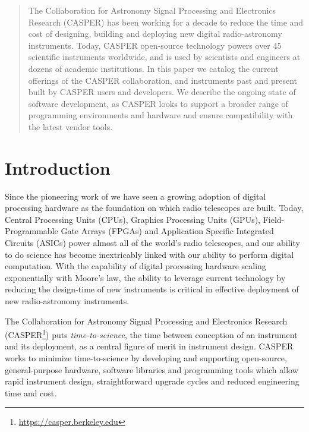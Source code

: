 \documentclass{ws-jai}
\begin{document}
\begin{abstract}

The Collaboration for Astronomy Signal Processing and Electronics Research
(CASPER) has been working for a decade to reduce the time and cost of
designing, building and deploying new digital radio-astronomy instruments.
Today, CASPER open-source technology powers over 45 scientific instruments
worldwide, and is used by scientists and engineers at dozens of academic
institutions.  In this paper we catalog the current offerings of the CASPER
collaboration, and instruments past and present built by CASPER users and developers.
We describe the ongoing state of software development, as CASPER looks to
support a broader range of programming environments and hardware and ensure compatibility
with the latest vendor tools.

\end{abstract}


\section{Introduction}\label{sec:introduction}

Since the pioneering work of \citet{Weinreb} we
have seen a growing adoption of digital processing hardware as the foundation
on which radio telescopes are built.  Today, Central Processing Units (CPUs), Graphics Processing Units (GPUs), Field-Programmable Gate Arrays (FPGAs) and Application Specific Integrated Circuits (ASICs) power
almost all of the world's radio telescopes, and our ability to do science has
become inextricably linked with our ability to perform digital computation.
With the capability of digital processing hardware scaling exponentially with
Moore's law, the ability to leverage current technology by reducing the
design-time of new instruments is critical in effective deployment of new
radio-astronomy instruments.

The Collaboration for Astronomy Signal Processing and Electronics Research
(CASPER\footnote{\url{https://casper.berkeley.edu}}) puts
\emph{time-to-science}, the time between conception of an instrument and its
deployment, as a central figure of merit in instrument design. CASPER works to
minimize time-to-science by developing and supporting open-source,
general-purpose hardware, software libraries and programming tools which allow
rapid instrument design, straightforward upgrade cycles and reduced engineering time and cost.
\end{document}
